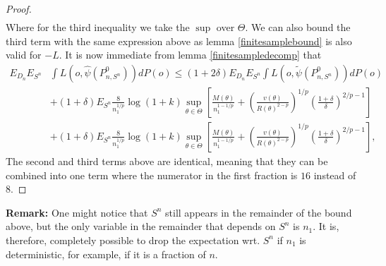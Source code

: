 \documentclass[11pt, a4paper]{article}
\theoremstyle{definition}
\theoremstyle{remark}
\newcommand{\btheta}{\theta}
\newcommand{\la}{\psi}
\newcommand{\Sn}{S^n}
\begin{document}
\begin{proof}[Proof]
\begin{align*}
\end{align*}
Where for the third inequality we take the $ \sup $ over $ \Theta $. We can also bound the third term with the same expression above as lemma \ref{finitesamplebound} is also valid for $ -L $. It is now immediate from lemma \ref{finitesampledecomp} that 
\begin{align*}
    E_{D_n} E_{\Sn} &\int L(o, \hat{\la}(P_{n, \Sn}^{0})) d P(o) \leq (1 + 2 \delta) E_{D_n} E_{\Sn} \int L(o, \tilde{\la}(P_{n, \Sn}^{0})) d P(o) \\
                    &+ (1 + \delta) E_{\Sn}\frac{8}{n_1^{1/p}} \log(1 + k) \sup_{\btheta \in \Theta} \left[ \frac{M(\btheta)}{n_1^{1-1/p}} + \left( \frac{v(\btheta)}{R(\btheta)^{2-p}} \right)^{1/p}\left( \frac{1 + \delta}{\delta}  \right)^{2/p-1} \right]\\
                    &+ (1 + \delta) E_{\Sn}\frac{8}{n_1^{1/p}} \log(1 + k) \sup_{\btheta \in \Theta} \left[ \frac{M(\btheta)}{n_1^{1-1/p}} + \left( \frac{v(\btheta)}{R(\btheta)^{2-p}} \right)^{1/p}\left( \frac{1 + \delta}{\delta}  \right)^{2/p-1} \right],
\end{align*}
The second and third terms above are identical, meaning that they can be combined into one term where the numerator in the first fraction is $ 16 $ instead of $ 8 $. 
\end{proof}

\textbf{Remark:} One might notice that $ \Sn $ still appears in the remainder of the bound above, but the only variable in the remainder that depends on $ \Sn $ is $ n_1 $. It is, therefore, completely possible to drop the expectation wrt. $ \Sn $ if $ n_1 $ is deterministic, for example, if it is a fraction of $ n $.  
\end{document}
